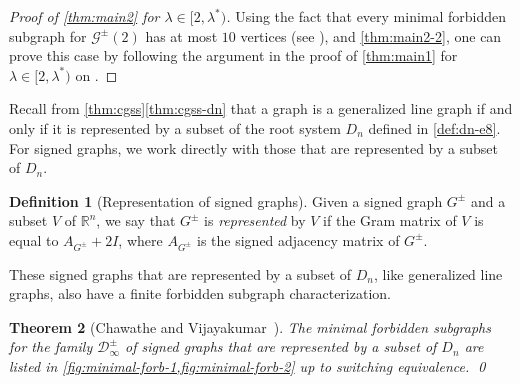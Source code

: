 \documentclass[11pt]{article}
\newtheorem{theorem}{Theorem}[section]
\theoremstyle{definition}
\newtheorem{definition}[theorem]{Definition}
\theoremstyle{remark}
\newcommand{\la}{\lambda}
\newcommand{\D}{\mathcal{D}}
\newcommand{\G}{\mathcal{G}}
\newcommand{\R}{\mathbb{R}}
\begin{document}
\begin{proof}[Proof of \cref{thm:main2} for $\la \in [2, \la^*)$]
    Using the fact that every minimal forbidden subgraph for $\G^\pm(2)$ has at most $10$ vertices (see \cite{V87}), and \cref{thm:main2-2}, one can prove this case by following the argument in the proof of \cref{thm:main1} for $\la \in [2, \la^*)$ on .
\end{proof}

Recall from \cref{thm:cgss}\ref{thm:cgss-dn} that a graph is a generalized line graph if and only if it is represented by a subset of the root system $D_n$ defined in \cref{def:dn-e8}. For signed graphs, we work directly with those that are represented by a subset of $D_n$.

\begin{definition}[Representation of signed graphs]
    Given a signed graph $G^\pm$ and a subset $V$ of $\R^n$, we say that $G^\pm$ is \emph{represented} by $V$ if the Gram matrix of $V$ is equal to $A_{G^\pm} + 2I$, where $A_{G^\pm}$ is the signed adjacency matrix of $G^\pm$.
\end{definition}

These signed graphs that are represented by a subset of $D_n$, like generalized line graphs, also have a finite forbidden subgraph characterization.

\begin{theorem}[Chawathe and Vijayakumar~\cite{CV90}] \label{thm:cv}
    The minimal forbidden subgraphs for the family $\D_\infty^\pm$ of signed graphs that are represented by a subset of $D_n$ are listed in \cref{fig:minimal-forb-1,fig:minimal-forb-2} up to switching equivalence. \qed
\end{theorem}
\end{document}
